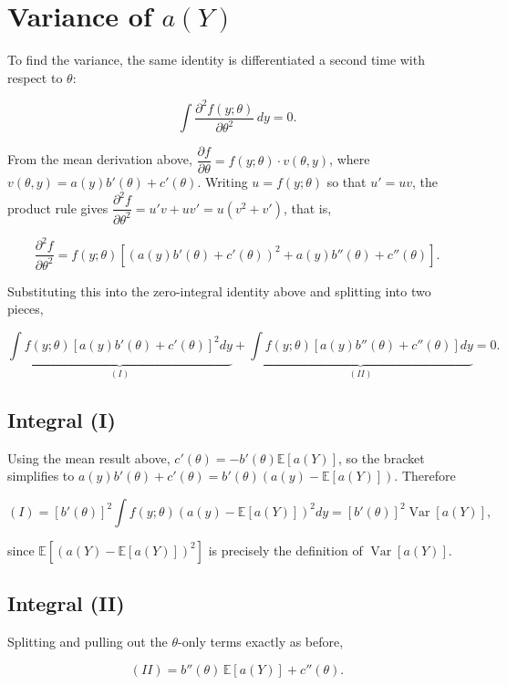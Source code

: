 \section{Variance of \texorpdfstring{$a(Y)$}{a(Y)}}
To find the variance, the same identity is differentiated a second time with respect to $\theta$:
\begin{mathbox}
\[
\int \frac{\partial^2 f(y;\theta)}{\partial\theta^2}\,dy = 0.
\]
\end{mathbox}
From the mean derivation above, $\dfrac{\partial f}{\partial\theta} = f(y;\theta)\cdot v(\theta,y)$, where $v(\theta,y) = a(y)b'(\theta)+c'(\theta)$. Writing $u=f(y;\theta)$ so that $u'=uv$, the product rule gives $\dfrac{\partial^2 f}{\partial\theta^2} = u'v+uv' = u(v^2+v')$, that is,
\begin{mathbox}
\[
\frac{\partial^2 f}{\partial\theta^2} = f(y;\theta)\left[(a(y)b'(\theta)+c'(\theta))^2 + a(y)b''(\theta)+c''(\theta)\right].
\]
\end{mathbox}
Substituting this into the zero-integral identity above and splitting into two pieces,
\begin{mathbox}
\[
\underbrace{\int f(y;\theta)\left[a(y)b'(\theta)+c'(\theta)\right]^2dy}_{(I)} + \underbrace{\int f(y;\theta)\left[a(y)b''(\theta)+c''(\theta)\right]dy}_{(II)} = 0.
\]
\end{mathbox}

\subsection*{Integral (I)}
Using the mean result above, $c'(\theta) = -b'(\theta)\mathbb{E}[a(Y)]$, so the bracket simplifies to $a(y)b'(\theta)+c'(\theta) = b'(\theta)\left(a(y)-\mathbb{E}[a(Y)]\right)$. Therefore
\begin{mathbox}
\[
(I) = [b'(\theta)]^2\int f(y;\theta)\left(a(y)-\mathbb{E}[a(Y)]\right)^2dy = [b'(\theta)]^2\operatorname{Var}[a(Y)],
\]
\end{mathbox}
since $\mathbb{E}\left[(a(Y)-\mathbb{E}[a(Y)])^2\right]$ is precisely the definition of $\operatorname{Var}[a(Y)]$.

\subsection*{Integral (II)}
Splitting and pulling out the $\theta$-only terms exactly as before,
\begin{mathbox}
\[
(II) = b''(\theta)\,\mathbb{E}[a(Y)] + c''(\theta).
\]
\end{mathbox}

